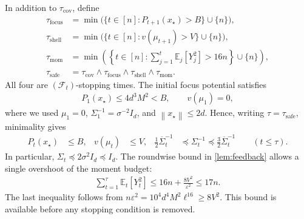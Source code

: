 \documentclass[11pt]{article}
\newcommand{\E}{\mathbb E}
\newcommand{\F}{\mathcal F}
\newcommand{\1}{\mathbf 1}
\newcommand{\eps}{\varepsilon}
\newcommand{\norm}[1]{\left\lVert #1\right\rVert}
\begin{document}
In addition to $\tau_{\mathrm{cov}}$, define
\begin{align}
    \tau_{\mathrm{focus}}
     & =\min\bigl(\{t\in[n]:P_{t+1}(x_\star)>B\}\cup\{n\}\bigr),
    \\
    \tau_{\mathrm{shell}}
     & =\min\bigl(\{t\in[n]:v(\mu_{t+1})>V\}\cup\{n\}\bigr),
    \\
    \tau_{\mathrm{mom}}
     & =\min\left(
    \left\{t\in[n]:\sum_{j=1}^t\E_j[Y_j^2]>16n\right\}
    \cup\{n\}\right),
    \\
    \tau_{\mathrm{safe}}
     & =\tau_{\mathrm{cov}}\wedge\tau_{\mathrm{focus}}
    \wedge\tau_{\mathrm{shell}}\wedge\tau_{\mathrm{mom}}.
    \label{eq:safe-stopping-time}
\end{align}
All four are $(\F_t)$-stopping times. The initial focus potential satisfies
\begin{align}
    P_1(x_\star)
    \leq4d^3M^2<B,
    \qquad v(\mu_1)=0,
    \label{eq:initial-focus}
\end{align}
where we used $\mu_1=0$, $\Sigma_1^{-1}=\sigma^{-2}I_d$, and
$\norm{x_\star}\leq2d$. Hence, writing $\tau=\tau_{\mathrm{safe}}$,
minimality gives
\begin{align}
    P_t(x_\star) & \leq B,
                 & v(\mu_t)                                                 & \leq V,
                 & \frac12\overline\Sigma_t^{-1}
                 & \preceq\Sigma_t^{-1}\preceq\frac32\overline\Sigma_t^{-1}
    \qquad(t\leq\tau).
    \label{eq:stability-stopped-invariants}
\end{align}
In particular, $\Sigma_t\preceq2\sigma^2I_d\preceq I_d$.
The roundwise bound in \cref{lem:feedback} allows a single overshoot of
the moment budget:
\begin{align}
    \sum_{t=1}^\tau\E_t[Y_t^2]
    \leq16n+\frac{8V^2}{\eps^2}
    \leq17n.
    \label{eq:stopped-moment-budget}
\end{align}
The last inequality follows from
$n\eps^2=10^4d^4M^2\ell^{16}\geq8V^2$.
This bound is available before any stopping condition is removed.
\end{document}
